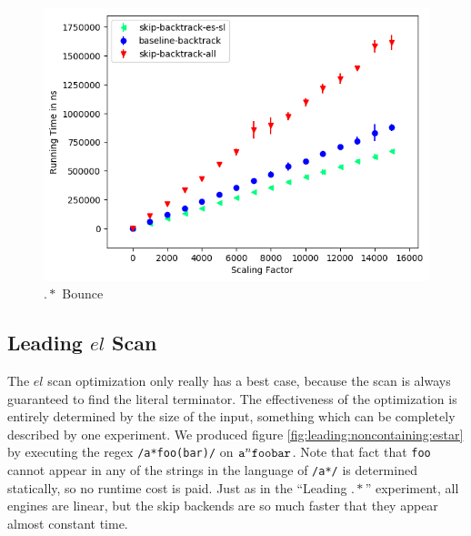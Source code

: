 \begin{figure}
\caption{$.*$ Bounce}
\label{fig:dotstar:bounce}

\includegraphics{resources/dotstar-bounce.png}
\end{figure}

\subsection{Leading $el$ Scan}

The $el$ scan optimization only really has a best case, because
the scan is always guaranteed to find the literal terminator. The
effectiveness of the optimization is entirely determined by the
size of the input, something which can be completely described
by one experiment. We produced figure \ref{fig:leading:noncontaining:estar}
by executing the regex \verb'/a*foo(bar)/' on ${\tt a}^n{\tt foobar}$.
Note that fact that \verb'foo' cannot appear in any of the strings
in the language of \verb'/a*/' is determined statically, so no
runtime cost is paid. Just as in the ``Leading $.*$'' experiment,
all engines are linear, but the skip backends are so much faster that
they appear almost constant time.


